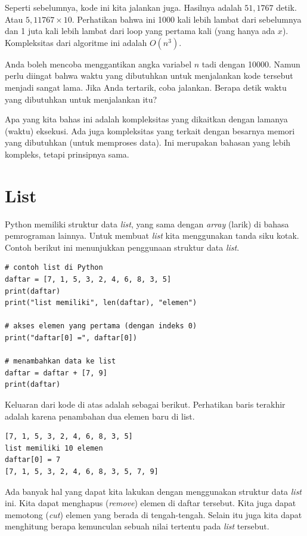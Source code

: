Seperti sebelumnya, kode ini kita jalankan juga. Hasilnya adalah $51,1767$ detik.
Atau $5,11767 \times 10$. Perhatikan bahwa ini 1000 kali lebih lambat dari sebelumnya
dan 1 juta kali lebih lambat dari loop yang pertama kali (yang hanya ada $x$).
Kompleksitas dari algoritme ini adalah $O(n^3)$.

Anda boleh mencoba menggantikan angka variabel $n$ tadi dengan 10000.
Namun perlu diingat bahwa waktu yang dibutuhkan untuk menjalankan kode
tersebut menjadi sangat lama. Jika Anda tertarik, coba jalankan.
Berapa detik waktu yang dibutuhkan untuk menjalankan itu?

Apa yang kita bahas ini adalah kompleksitas yang dikaitkan dengan lamanya
(waktu) eksekusi. Ada juga kompleksitas yang terkait dengan besarnya
memori yang dibutuhkan (untuk memproses data).
Ini merupakan bahasan yang lebih kompleks, tetapi prinsipnya sama.

\section{List}
Python memiliki struktur data {\em list}, yang sama dengan {\em array}
(larik) di bahasa pemrograman lainnya. Untuk membuat {\em list} kita
menggunakan tanda siku kotak. Contoh berikut ini menunjukkan penggunaan 
struktur data {\em list}.

\begin{verbatim}
# contoh list di Python
daftar = [7, 1, 5, 3, 2, 4, 6, 8, 3, 5]
print(daftar)
print("list memiliki", len(daftar), "elemen")

# akses elemen yang pertama (dengan indeks 0)
print("daftar[0] =", daftar[0])

# menambahkan data ke list
daftar = daftar + [7, 9]
print(daftar)
\end{verbatim}

Keluaran dari kode di atas adalah sebagai berikut.
Perhatikan baris terakhir adalah karena penambahan dua elemen baru
di list.
\begin{verbatim}
[7, 1, 5, 3, 2, 4, 6, 8, 3, 5]
list memiliki 10 elemen
daftar[0] = 7
[7, 1, 5, 3, 2, 4, 6, 8, 3, 5, 7, 9]
\end{verbatim}

Ada banyak hal yang dapat kita lakukan dengan menggunakan struktur data
{\em list} ini. Kita dapat menghapus ({\em remove}) elemen di daftar tersebut.
Kita juga dapat memotong ({\em cut}) elemen yang berada di tengah-tengah.
Selain itu juga kita dapat menghitung berapa kemunculan sebuah nilai
tertentu pada {\em list} tersebut.

